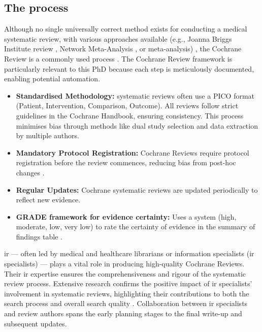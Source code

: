 \documentclass[10pt,oneside]{book}
\begin{document}
\subsection{The process}

Although no single universally correct method exists for conducting a medical systematic review, with various approaches available (e.g., Joanna Briggs Institute review \cite{santos_joanna_2018}, Network Meta-Analysis \cite{bafeta_reporting_2014}, or meta-analysis\cite{moher_improving_1999}) \cite{munn_what_2018}, the Cochrane Review is a commonly used process \cite{cipriani_what_2011}. The Cochrane Review framework is particularly relevant to this PhD because each step is meticulously documented, enabling potential automation.


\begin{itemize}
    \item {\bf{Standardised Methodology:}} systematic reviews often use a PICO format (Patient, Intervention, Comparison, Outcome). All reviews follow strict guidelines in the Cochrane Handbook, ensuring consistency. This process minimises bias through methods like dual study selection and data extraction by multiple authors.
    \item {\bf{Mandatory Protocol Registration:}} Cochrane Reviews require protocol registration before the review commences, reducing bias from post-hoc changes \cite{cumpston_chapter_2024}.
    \item {\bf{Regular Updates:}} Cochrane systematic reviews are updated periodically to reflect new evidence.
    \item {\bf{GRADE framework for evidence certainty:}} Uses a system (high, moderate, low, very low) to rate the certainty of evidence in the summary of findings table \cite{guyatt_grade_2008}.
\end{itemize}



\gls*{ir} — often led by medical and healthcare librarians or information specialists (\gls*{ir} specialists) — plays a vital role in producing high-quality Cochrane Reviews. Their \gls*{ir} expertise ensures the comprehensiveness and rigour of the systematic review process. Extensive research confirms the positive impact of \gls*{ir} specialists' involvement in systematic reviews, highlighting their contributions to both the search process \cite{le_benchmarking_2023, brunskill_case_2022, schvaneveldt_assessing_2021} and overall search quality \cite{giroudon_qualite_2023, pawliuk_librarian_2024, ramirez_adherence_2022}. Collaboration between \gls*{ir} specialists and review authors spans the early planning stages to the final write-up and subsequent updates.
\end{document}

